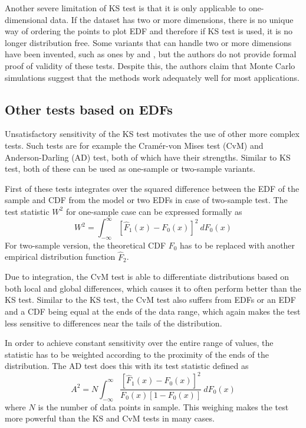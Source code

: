\documentclass[english, oneside]{HYgradu}
\begin{document}
Another severe limitation of KS test is that it is only applicable to one-dimensional data. If the dataset has two or more dimensions, there is no unique way of ordering the points to plot EDF and therefore if KS test is used, it is no longer distribution free. Some variants that can handle two or more dimensions have been invented, such as ones by \citet{peacock1983twodimensional} and \citet{fasano1987multidimensional}, but the authors do not provide formal proof of validity of these tests. Despite this, the authors claim that Monte Carlo simulations suggest that the methods work adequately well for most applications.



\subsection{Other tests based on EDFs}
Unsatisfactory sensitivity of the KS test motivates the use of other more complex tests. Such tests are for example the Cram\'er-von Mises test (CvM) and Anderson-Darling (AD) test, both of which have their strengths. Similar to KS test, both of these can be used as one-sample or two-sample variants.  

First of these tests integrates over the squared difference between the EDF of the sample and CDF from the model or two EDFs in case of two-sample test. The test statistic $W^2$ for one-sample case can be expressed formally as
\begin{equation}
	W^2 = \int_{-\infty}^{\infty}[\hat F_1(x) - F_0(x)]^2\ dF_0(x)
\end{equation}
For two-sample version, the theoretical CDF $F_0$ has to be replaced with another empirical distribution function $\hat F_2$.

Due to integration, the CvM test is able to differentiate distributions based on both local and global differences, which causes it to often perform better than the KS test. Similar to the KS test, the CvM test also suffers from EDFs or an EDF and a CDF being equal at the ends of the data range, which again makes the test less sensitive to differences near the tails of the distribution. 

In order to achieve constant sensitivity over the entire range of values, the statistic has to be weighted according to the proximity of the ends of the distribution. The AD test does this with its test statistic defined as
\begin{equation}
	A^2 = N \int_{-\infty}^{\infty} \frac{[\hat F_1(x) - F_0(x)]^2}{F_0(x)[1-F_0(x)]}\ dF_0(x)
\end{equation}
where $N$ is the number of data points in sample. This weighing makes the test more powerful than the KS and CvM tests in many cases. \citep{bohm2010introduction, feigelson2012modern}
\end{document}
